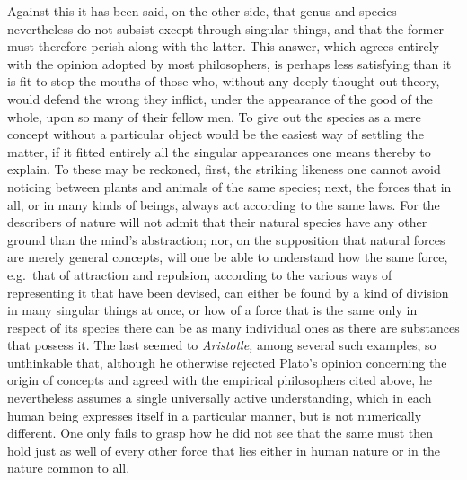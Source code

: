 \documentclass[12pt,a4paper,openany]{book}
\newcommand{\opage}[1]{\marginnote{\footnotesize\textit{[#1]}}}
\begin{document}
Against this it has been said, on the other side, that genus and species
nevertheless do not subsist except through singular things, and that the former
must therefore perish along with the latter. This answer, which agrees entirely
with the opinion adopted by most philosophers, is perhaps less satisfying than it
is fit to stop the mouths of those who, without any deeply thought-out theory,
would defend the wrong they inflict, under the appearance of the good of the
whole, upon so many of their fellow men. To give out the species as a mere
concept without a particular object would be the easiest way of settling the
matter, if it fitted entirely all the singular appearances one means thereby to
explain. To these may be reckoned, first, the striking likeness one cannot avoid
noticing between plants and animals of the same species; next, the forces that in
all, or in many kinds of beings, always act according to the same laws. For the
describers of nature will not admit that their natural species have any other
ground than the mind's abstraction; nor, on the supposition that natural forces
are merely general concepts, will one be able to understand how the same force,
e.g.\ that of attraction and repulsion, according to the various ways of
representing it that have been devised, can either be found by a kind of division
in many singular things at once, or how of a force that is the same only in
respect of its species there can be as many individual ones as there are
substances that
\setcounter{footnote}{0}%
\opage{102}possess it. The last seemed to \textit{Aristotle,} among several such examples, so
unthinkable that, although he otherwise rejected Plato's opinion concerning the
origin of concepts and agreed with the empirical philosophers cited above, he
nevertheless assumes a single universally active understanding, which in each
human being expresses itself in a particular manner, but is not numerically
different. One only fails to grasp how he did not see that the same must then
hold just as well of every other force that lies either in human nature or in the
nature common to all.
\end{document}
